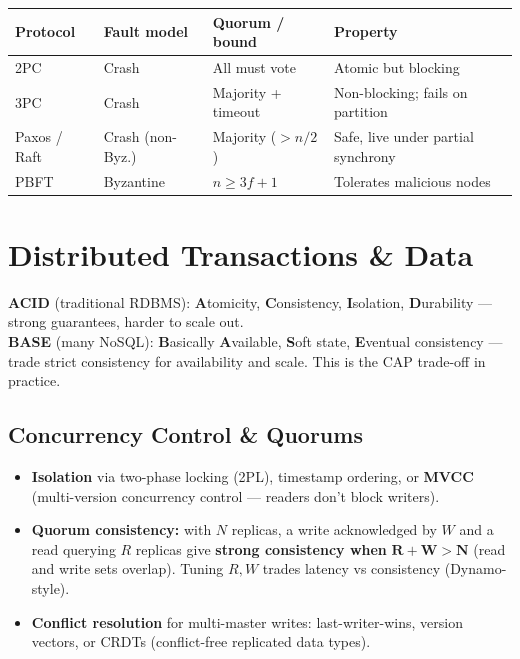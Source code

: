 \documentclass[11pt,a4paper]{article}
\begin{document}
\begin{longtable}{@{}p{2.8cm}p{2.6cm}p{3.2cm}p{4.6cm}@{}}
\toprule
\rowcolor{primary!15}
\textbf{Protocol} & \textbf{Fault model} & \textbf{Quorum / bound} & \textbf{Property} \\
\midrule
\endhead
2PC & Crash & All must vote & Atomic but blocking \\
3PC & Crash & Majority + timeout & Non-blocking; fails on partition \\
Paxos / Raft & Crash (non-Byz.) & Majority ($> n/2$) & Safe, live under partial synchrony \\
PBFT & Byzantine & $n \ge 3f+1$ & Tolerates malicious nodes \\
\bottomrule
\end{longtable}

\section{Distributed Transactions \& Data}

\begin{definitionbox}
\textbf{ACID} (traditional RDBMS): \textbf{A}tomicity, \textbf{C}onsistency, \textbf{I}solation, \textbf{D}urability --- strong guarantees, harder to scale out.\\[3pt]
\textbf{BASE} (many NoSQL): \textbf{B}asically \textbf{A}vailable, \textbf{S}oft state, \textbf{E}ventual consistency --- trade strict consistency for availability and scale. This is the CAP trade-off in practice.
\end{definitionbox}

\subsection{Concurrency Control \& Quorums}
\begin{itemize}[leftmargin=*, itemsep=2pt]
  \item \textbf{Isolation} via two-phase locking (2PL), timestamp ordering, or \textbf{MVCC} (multi-version concurrency control --- readers don't block writers).
  \item \textbf{Quorum consistency:} with $N$ replicas, a write acknowledged by $W$ and a read querying $R$ replicas give \textbf{strong consistency when} $\mathbf{R + W > N}$ (read and write sets overlap). Tuning $R,W$ trades latency vs consistency (Dynamo-style).
  \item \textbf{Conflict resolution} for multi-master writes: last-writer-wins, version vectors, or CRDTs (conflict-free replicated data types).
\end{itemize}
\end{document}
